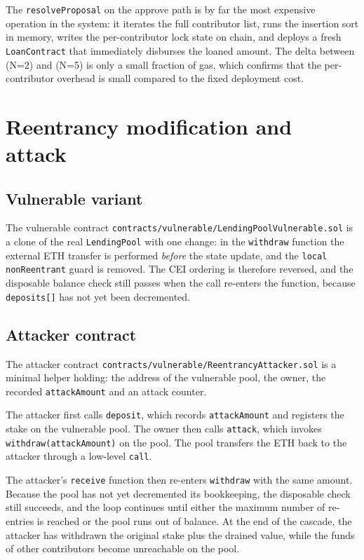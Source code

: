 \documentclass{report}
\begin{document}
The \texttt{resolveProposal} on the approve path is by far the most expensive operation in the system: it iterates the full contributor list, runs the insertion sort in memory, writes the per-contributor lock state on chain, and deploys a fresh \texttt{LoanContract} that immediately disburses the loaned amount. The delta between (N=2) and (N=5) is only a small fraction of gas, which confirms that the per-contributor overhead is small compared to the fixed deployment cost.

\section*{Reentrancy modification and attack}
\subsection*{Vulnerable variant}
The vulnerable contract \texttt{contracts/vulnerable/LendingPoolVulnerable.sol} is a clone of the real \texttt{LendingPool} with one change: in the \texttt{withdraw} function the external ETH transfer is performed \emph{before} the state update, and the \texttt{local nonReentrant} guard is removed. The CEI ordering is therefore reversed, and the disposable balance check still passes when the call re-enters the function, because \texttt{deposits[]} has not yet been decremented.

\subsection*{Attacker contract}
The attacker contract \texttt{contracts/vulnerable/ReentrancyAttacker.sol} is a minimal helper holding: the address of the vulnerable pool, the owner, the recorded \texttt{attackAmount} and an attack counter. 

The attacker first calls \texttt{deposit}, which records \texttt{attackAmount} and registers the stake on the vulnerable pool. The owner then calls \texttt{attack}, which invokes \texttt{withdraw(attackAmount)} on the pool. The pool transfers the ETH back to the attacker through a low-level \texttt{call}.

The attacker's \texttt{receive} function then re-enters \texttt{withdraw} with the same amount. Because the pool has not yet decremented its bookkeeping, the disposable check still succeeds, and the loop continues until either the maximum number of re-entries is reached or the pool runs out of balance. At the end of the cascade, the attacker has withdrawn the original stake plus the drained value, while the funds of other contributors become unreachable on the pool.
\end{document}
